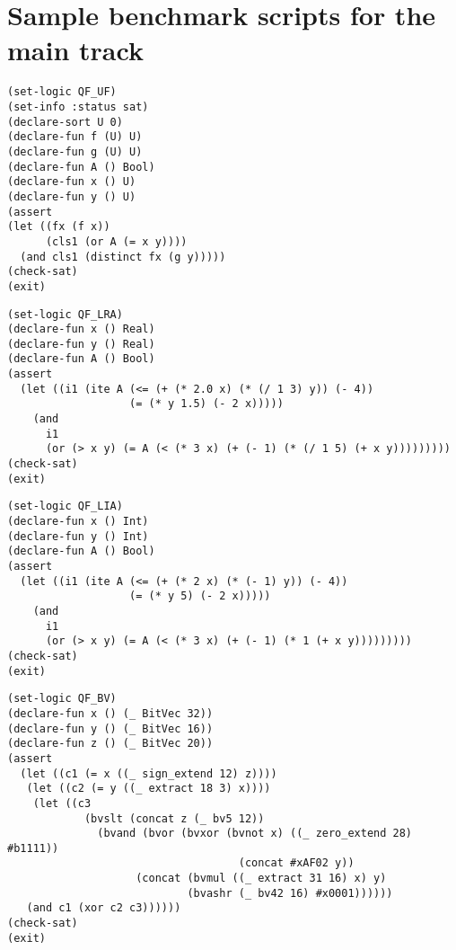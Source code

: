 \documentclass[12pt]{article}
\begin{document}
\appendix
\section{Sample benchmark scripts for the main track}


{\footnotesize
\begin{verbatim}
(set-logic QF_UF)
(set-info :status sat)
(declare-sort U 0)
(declare-fun f (U) U)
(declare-fun g (U) U)
(declare-fun A () Bool)
(declare-fun x () U)
(declare-fun y () U)
(assert
(let ((fx (f x))
      (cls1 (or A (= x y))))
  (and cls1 (distinct fx (g y)))))
(check-sat)
(exit)
\end{verbatim}}



{\footnotesize
\begin{verbatim}
(set-logic QF_LRA)
(declare-fun x () Real)
(declare-fun y () Real)
(declare-fun A () Bool)
(assert
  (let ((i1 (ite A (<= (+ (* 2.0 x) (* (/ 1 3) y)) (- 4))
                   (= (* y 1.5) (- 2 x)))))
    (and
      i1
      (or (> x y) (= A (< (* 3 x) (+ (- 1) (* (/ 1 5) (+ x y)))))))))
(check-sat)
(exit)
\end{verbatim}}



{\footnotesize
\begin{verbatim}
(set-logic QF_LIA)
(declare-fun x () Int)
(declare-fun y () Int)
(declare-fun A () Bool)
(assert
  (let ((i1 (ite A (<= (+ (* 2 x) (* (- 1) y)) (- 4))
                   (= (* y 5) (- 2 x)))))
    (and
      i1
      (or (> x y) (= A (< (* 3 x) (+ (- 1) (* 1 (+ x y)))))))))
(check-sat)
(exit)
\end{verbatim}}



{\footnotesize
\begin{verbatim}
(set-logic QF_BV)
(declare-fun x () (_ BitVec 32))
(declare-fun y () (_ BitVec 16))
(declare-fun z () (_ BitVec 20))
(assert
  (let ((c1 (= x ((_ sign_extend 12) z))))
   (let ((c2 (= y ((_ extract 18 3) x))))
    (let ((c3 
            (bvslt (concat z (_ bv5 12)) 
              (bvand (bvor (bvxor (bvnot x) ((_ zero_extend 28) #b1111)) 
                                    (concat #xAF02 y))
                    (concat (bvmul ((_ extract 31 16) x) y) 
                            (bvashr (_ bv42 16) #x0001))))))
   (and c1 (xor c2 c3))))))
(check-sat)
(exit)
\end{verbatim}}
\end{document}
